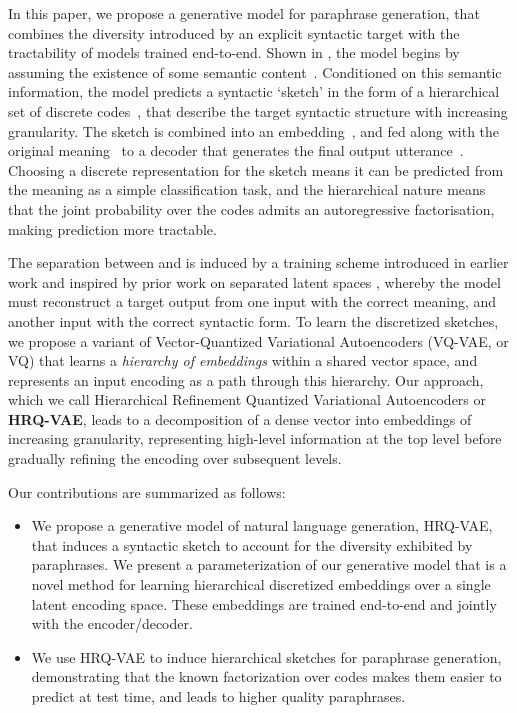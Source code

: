 \documentclass[11pt]{article}
\begin{document}
In this paper, we propose a generative model for paraphrase generation, that combines the diversity introduced by an explicit syntactic target with the tractability of models trained end-to-end. Shown in , the model begins by assuming the existence of some semantic content~. Conditioned on this semantic information, the model predicts a syntactic `sketch' in the form of a hierarchical set of discrete codes~, that describe the target syntactic structure with increasing granularity. The sketch is combined into an embedding~, and fed along with the original meaning~ to a decoder that generates the final output utterance~. Choosing a discrete representation for the sketch means it can be predicted from the meaning as a simple classification task, and the hierarchical nature means that the joint probability over the codes admits an autoregressive factorisation, making prediction more tractable.

The separation between  and  is induced by a training scheme introduced in earlier work  \cite{hosking-lapata-2021-factorising,huang-chang-2021-generating} and inspired by prior work on separated latent spaces \cite{chen-etal-2019-multi, bao-etal-2019-generating}, whereby the model must reconstruct a target output from one input with the correct meaning, and another input with the correct syntactic form. To learn the discretized sketches, we propose a variant of
Vector-Quantized Variational Autoencoders (VQ-VAE, or VQ) that learns
a \textit{hierarchy of embeddings} within a shared vector space, and represents an input encoding as
a path through this hierarchy. Our approach, which we call
Hierarchical Refinement Quantized Variational Autoencoders or
\textbf{HRQ-VAE}, leads to a decomposition of a dense vector into
embeddings of increasing granularity, representing high-level
information at the top level before gradually refining the encoding
over subsequent levels.








Our contributions are summarized as follows:

\begin{itemize}
    \vspace{-0.2cm}\item We propose a generative model of natural language generation, HRQ-VAE, that induces a syntactic sketch to account for the diversity exhibited by paraphrases. We present a parameterization of our generative model that is a novel method for learning hierarchical discretized embeddings over a single latent encoding space. These embeddings are trained end-to-end and jointly with the encoder/decoder.
    \vspace{-0.2cm}\item We use HRQ-VAE to induce hierarchical
    sketches for paraphrase generation, demonstrating that the known
    factorization over codes makes them easier to predict at
    test time, and leads to higher quality paraphrases.
\end{itemize}
\end{document}
